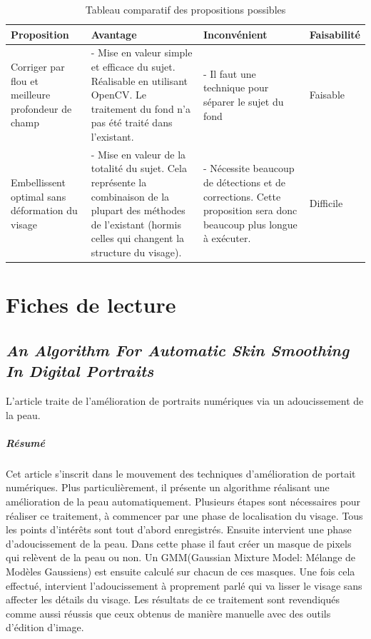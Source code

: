 \documentclass[11pt, french,screen]{report-rd-info}
\begin{document}
\begin{table}
\begin{center}
\begin{tabular}{|p{3cm}|p{4cm}|p{4cm}|p{4cm}|}
\hline
Proposition & Avantage & Inconvénient & Faisabilité \\ \hline
Corriger par flou et meilleure profondeur de champ & - Mise en valeur simple et efficace du sujet. Réalisable en utilisant OpenCV. Le traitement du fond n'a pas été traité dans l'existant. & - Il faut une technique pour séparer le sujet du fond & Faisable \\ \hline
Embellissent optimal sans déformation du visage & - Mise en valeur de la totalité du sujet. Cela représente la combinaison de la plupart des méthodes de l'existant (hormis celles qui changent la structure du visage). & - Nécessite beaucoup de détections et de corrections. Cette proposition sera donc beaucoup plus longue à exécuter. & Difficile \\ \hline
\end{tabular}
\end{center}
\caption{Tableau comparatif des propositions possibles}
\label{tab:compprop}
\end{table}

\listoffigures{}
\listoftables{}
\appendix
\chapter{Fiches de lecture}
\label{ann:FichesLecture}
\section{\emph{An Algorithm For Automatic Skin Smoothing In Digital Portraits}}
L'article \cite{Lee} traite de l'amélioration de portraits numériques via un adoucissement de la peau.
\paragraph{Résumé}
Cet article s'inscrit dans le mouvement des techniques d'amélioration de portait numériques.
Plus particulièrement, il présente un algorithme réalisant une amélioration de la peau automatiquement.
Plusieurs étapes sont nécessaires pour réaliser ce traitement, à commencer par une phase de localisation du visage.
Tous les points d'intérêts sont tout d'abord enregistrés. Ensuite intervient une phase d'adoucissement de la peau.
Dans cette phase il faut créer un masque de pixels qui relèvent de la peau ou non.
Un GMM(Gaussian Mixture Model: Mélange de Modèles Gaussiens) est ensuite calculé sur chacun de ces masques.
Une fois cela effectué, intervient l'adoucissement à proprement parlé qui va lisser le visage sans affecter les détails du visage.
Les résultats de ce traitement sont revendiqués comme aussi réussis que ceux obtenus de manière manuelle avec des outils d'édition d'image.
\end{document}

